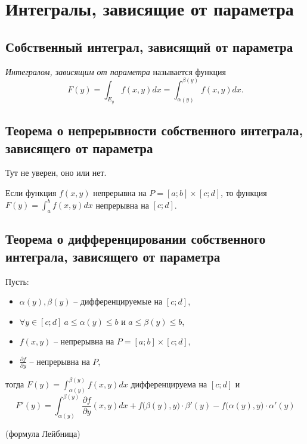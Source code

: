 \section{Интегралы, зависящие от параметра}

\setcounter{subsection}{103}

\subsection{Собственный интеграл, зависящий от параметра}

\begin{definition}
    \emph{Интегралом, зависящим от параметра} называется функция
    \[
        F(y) = \int_{E_y}f(x,y)dx = \int_{\alpha(y)}^{\beta(y)}f(x,y)dx.
    \]
\end{definition}

\subsection{Теорема о непрерывности собственного интеграла, зависящего от параметра}

Тут не уверен, оно или нет.

\begin{theorem}\label{theorem:7.1.1}
    Если функция $f(x,y)$ непрерывна на $P = [a;b] \times [c;d]$, то функция $F(y) = \int_{a}^{b}f(x,y)dx$ непрерывна на $[c;d]$.
\end{theorem}

\subsection{Теорема о дифференцировании собственного интеграла, зависящего от параметра}

\begin{theorem}\label{theorem:7.1.2}
    Пусть:
    \begin{itemize}
        \item $\alpha(y), \beta(y)$ -- дифференцируемые на $[c;d]$,
        \item $\forall y \in [c;d] \ a\leqslant \alpha(y) \leqslant b$ и $a \leqslant \beta(y) \leqslant b$,
        \item $f(x,y)$ -- непрерывна на $P = [a;b] \times [c;d]$,
        \item $\frac{\partial f}{\partial y}$ -- непрерывна на $P$,
    \end{itemize}
    тогда $F(y) = \int_{\alpha(y)}^{\beta(y)}f(x,y)dx$ дифференцируема на $[c;d]$ и
    \[
        F'(y) = \int_{\alpha(y)}^{\beta(y)}\frac{\partial f}{\partial y}(x,y)dx + f\big(\beta(y),y\big) \cdot \beta'(y) - f\big(\alpha(y),y\big)\cdot \alpha'(y)
    \]
    \begin{center}
        (формула Лейбница)
    \end{center}
\end{theorem}


